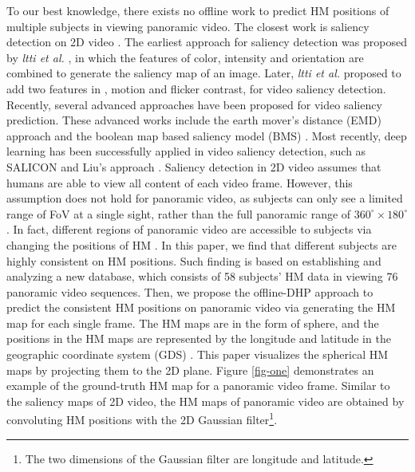 \documentclass[10pt,journal,compsoc]{IEEEtran}
\begin{document}
To our best knowledge, there exists no offline work to predict HM positions of multiple subjects in viewing panoramic video. The closest work is saliency detection on 2D video \cite{borji2013state}. The earliest approach for saliency detection was proposed by \textit{ltti et al.} \cite{itti1998model}, in which the features of color, intensity and orientation are combined to generate the saliency map of an image. Later, \textit{ltti et al.} \cite{itti2004automatic} proposed to add two features in \cite{itti1998model}, motion and flicker contrast, for video saliency detection. Recently, several advanced approaches have been proposed for video saliency prediction. These advanced works include  the earth mover's distance (EMD) approach \cite{lin2013visual} and the boolean map based saliency model (BMS) \cite{zhang2016exploiting}.
Most recently, deep learning has been successfully applied in video saliency detection,
such as SALICON \cite{huang2015salicon} and Liu's approach \cite{Liu2017cvpr}.
Saliency detection in 2D video assumes that humans are able to view all content of each video frame.
However, this assumption does not hold for panoramic video, as subjects can only see a limited range of FoV at a single sight, rather than the full panoramic range of $360^{\circ} \times 180^{\circ}$.
In fact, different regions of panoramic video are accessible to subjects via changing the positions of HM \cite{lowe2015visualization}.
In this paper, we find that different subjects are highly consistent on HM positions.
Such finding is based on establishing and analyzing a new database, which consists of 58 subjects' HM data in viewing 76 panoramic video sequences.
Then, we propose the offline-DHP approach to predict the consistent HM positions on panoramic video via generating the HM map for each single frame.
The HM maps are in the form of sphere, and the positions in the HM maps are represented by the longitude and latitude in the geographic coordinate system (GDS) \cite{Goodchild2007}. This paper visualizes the spherical HM maps by projecting them to the 2D plane.
Figure \ref{fig-one} demonstrates an example of the ground-truth HM map for a panoramic video frame. Similar to the saliency maps of 2D video, the HM maps of panoramic video are obtained by convoluting HM positions with the 2D Gaussian filter\footnote{The two dimensions of the Gaussian filter are longitude and latitude.}.

\end{document}
